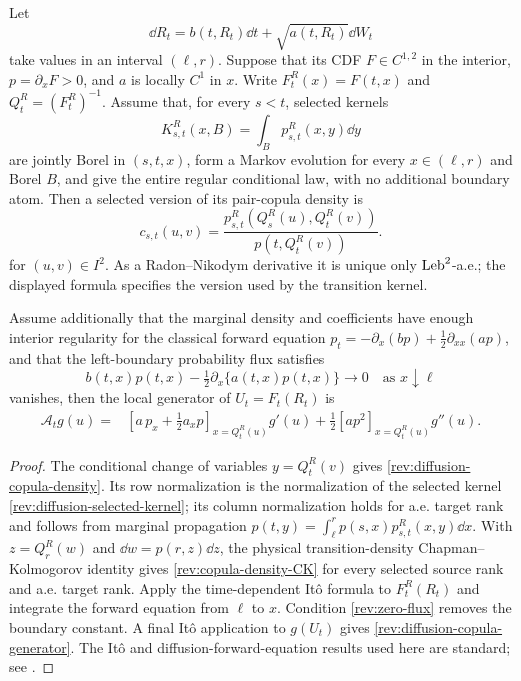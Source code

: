 \begin{proposition}
\label{rev:prop-diffusion-copula-generator}
Let
\begin{equation}
\dd R_t=b(t,R_t)\dd t+\sqrt{a(t,R_t)}\dd W_t
\label{rev:general-diffusion}
\end{equation}
take values in an interval $(\ell,r)$.  Suppose that its CDF
$F\in C^{1,2}$ in the interior, $p=\partial_xF>0$, and $a$ is locally $C^1$
in $x$.  Write $F_t^R(x)=F(t,x)$ and $Q_t^R=(F_t^R)^{-1}$.  Assume that, for
every $s<t$, selected kernels
\begin{equation}
K^R_{s,t}(x,B)=\int_Bp^R_{s,t}(x,y)\dd y
\label{rev:diffusion-selected-kernel}
\end{equation}
are jointly Borel in $(s,t,x)$, form a Markov evolution for every
$x\in(\ell,r)$ and Borel $B$, and give the entire regular conditional law,
with no additional boundary atom.  Then a selected version of its pair-copula
density is
\begin{equation}
c_{s,t}(u,v)=
\frac{p^R_{s,t}\!\left(Q_s^R(u),Q_t^R(v)\right)}
     {p\!\left(t,Q_t^R(v)\right)}.
\label{rev:diffusion-copula-density}
\end{equation}
for $(u,v)\in I^2$.  As a Radon--Nikodym derivative it is unique only
$\operatorname{Leb}^2$-a.e.; the displayed formula specifies the version used by the
transition kernel.

Assume additionally that the marginal density and coefficients have enough
interior regularity for the classical forward equation
$p_t=-\partial_x(bp)+\tfrac12\partial_{xx}(ap)$, and that the left-boundary
probability flux satisfies
\begin{equation}
b(t,x)p(t,x)-\tfrac12\partial_x\{a(t,x)p(t,x)\}
\longrightarrow0\quad\text{as }x\downarrow\ell
\label{rev:zero-flux}
\end{equation}
vanishes, then the local generator of $U_t=F_t(R_t)$ is
\begin{align}
\mathcal A_tg(u)
={}&\left[a\,p_x+\tfrac12a_xp\right]_{x=Q_t^R(u)}g'(u)
+\frac12\left[ap^2\right]_{x=Q_t^R(u)}g''(u).
\label{rev:diffusion-copula-generator}
\end{align}
\end{proposition}

\begin{proof}
The conditional change of variables $y=Q_t^R(v)$ gives
\eqref{rev:diffusion-copula-density}.  Its row normalization is the
normalization of the selected kernel \eqref{rev:diffusion-selected-kernel}; its
column normalization holds for a.e. target rank and follows from marginal
propagation
$p(t,y)=\int_\ell^r p(s,x)p^R_{s,t}(x,y)\dd x$.
With $z=Q_r^R(w)$ and $\dd w=p(r,z)\dd z$, the physical transition-density
Chapman--Kolmogorov identity gives \eqref{rev:copula-density-CK} for every
selected source rank and a.e. target rank.  Apply the time-dependent It\^o
formula to $F_t^R(R_t)$ and integrate the forward equation from $\ell$ to $x$.
Condition \eqref{rev:zero-flux} removes the boundary constant.  A final It\^o
application to $g(U_t)$ gives \eqref{rev:diffusion-copula-generator}.  The
It\^o and diffusion-forward-equation results used here are standard; see
\citet[Chapters~5--6]{KaratzasShreve1991}.
\end{proof}

